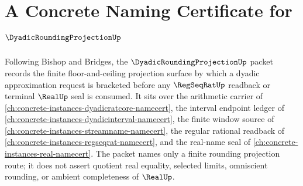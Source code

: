 \chapter{A Concrete Naming Certificate for $\DyadicRoundingProjectionUp$}
\label{ch:concrete-instances-dyadic-rounding-projection-namecert}

Following Bishop and Bridges, the $\DyadicRoundingProjectionUp$ packet records the finite floor-and-ceiling projection surface by which a dyadic approximation request is bracketed before any $\RegSeqRatUp$ readback or terminal $\RealUp$ seal is consumed. It sits over the arithmetic carrier of \autoref{ch:concrete-instances-dyadicratcore-namecert}, the interval endpoint ledger of \autoref{ch:concrete-instances-dyadicinterval-namecert}, the finite window source of \autoref{ch:concrete-instances-streamname-namecert}, the regular rational readback of \autoref{ch:concrete-instances-regseqrat-namecert}, and the real-name seal of \autoref{ch:concrete-instances-real-namecert}. The packet names only a finite rounding projection route; it does not assert quotient real equality, selected limits, omniscient rounding, or ambient completeness of $\RealUp$.

